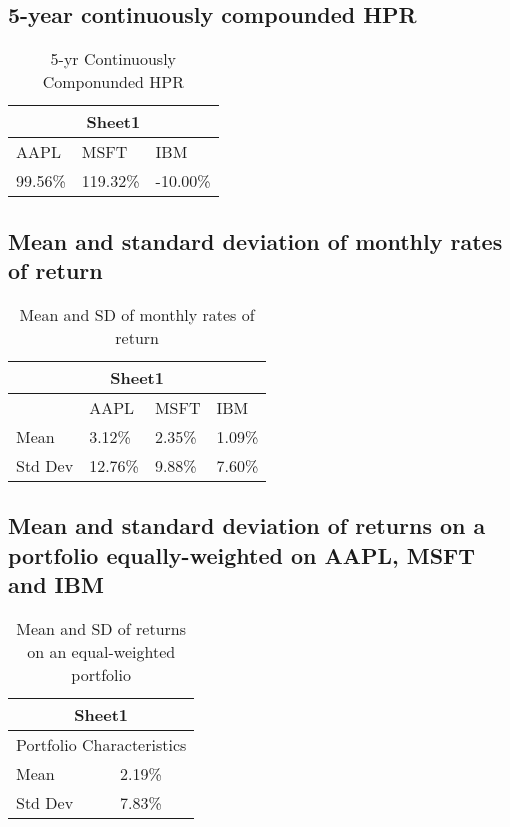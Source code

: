 \documentclass[12pt]{article}
\begin{document}
\subsection{5-year continuously compounded HPR}

\begin{table}[H]
	\centering
	\caption{5-yr Continuously Componunded HPR}
	\begin{tabular}{ |p{2cm}|p{2cm}|p{2cm}| }
		\hline
		\multicolumn{3}{|c|}{Sheet1}\\
		\hline
		AAPL & MSFT & IBM\\
		\hline
		99.56\% & 119.32\% & -10.00\%\\
		\hline
	\end{tabular}
\end{table}

\subsection{Mean and standard deviation of monthly rates of return}
\begin{table}[H]
	\centering
	\caption{Mean and SD of monthly rates of return}
	\begin{tabular}{ |p{2cm}||p{2cm}|p{2cm}|p{2cm}| }
		\hline
		\multicolumn{4}{|c|}{Sheet1}\\
		\hline
		& AAPL & MSFT & IBM\\
		\hline
		Mean & 3.12\% & 2.35\% & 1.09\%\\
		Std Dev & 12.76\% & 9.88\% & 7.60\%\\
		\hline
	\end{tabular}
\end{table}

\subsection{Mean and standard deviation of returns on a portfolio equally-weighted on AAPL, MSFT and IBM}
\begin{table}[H]
	\centering
	\caption{Mean and SD of returns on an equal-weighted portfolio}
	\begin{tabular}{ |p{2cm}||p{2cm}| }
		\hline
		\multicolumn{2}{|c|}{Sheet1}\\
		\hline
		\multicolumn{2}{|c|}{Portfolio Characteristics}\\
		\hline
		Mean & 2.19\%\\
		Std Dev & 7.83\%\\
		\hline
	\end{tabular}
\end{table}
\end{document}
